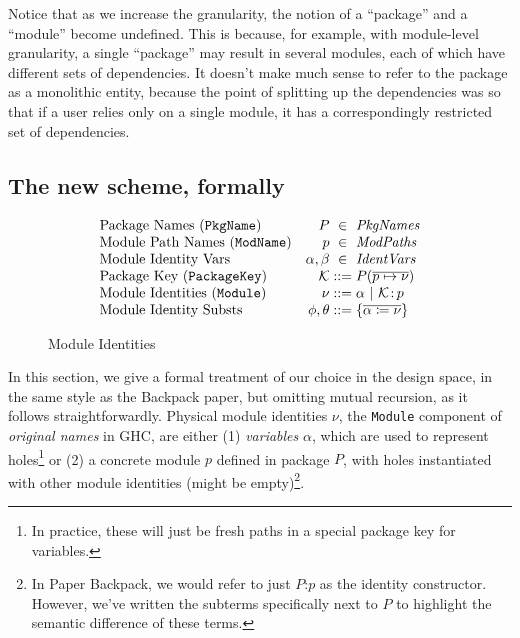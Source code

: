\documentclass{article}
\begin{document}
Notice that as we increase the granularity, the notion of a ``package'' and a ``module''
become undefined.  This is because, for example, with module-level granularity, a single
``package'' may result in several modules, each of which have different sets of
dependencies.  It doesn't make much sense to refer to the package as a monolithic entity,
because the point of splitting up the dependencies was so that if a user relies only
on a single module, it has a correspondingly restricted set of dependencies.
\subsection{The new scheme, formally}

\begin{figure}
\begin{myfig}
\[
\begin{array}{@{}lr@{\;}c@{\;}l@{}}
    \text{Package Names (\texttt{PkgName})} & P &\in& \mathit{PkgNames} \\
    \text{Module Path Names (\texttt{ModName})} & p &\in& \mathit{ModPaths} \\
    \text{Module Identity Vars} & \alpha,\beta &\in& \mathit{IdentVars} \\
    \text{Package Key (\texttt{PackageKey})} & \K &::=& P(\vec{p\mapsto\nu}) \\
    \text{Module Identities (\texttt{Module})} & \nu &::=&
      \alpha ~|~
      \K\colon\! p \\
    \text{Module Identity Substs} & \phi,\theta &::=&
      \{\vec{\alpha \coloneqq \nu}\} \\
\end{array}
\]
\caption{Module Identities}
\label{fig:mod-idents}
\end{myfig}
\end{figure}

In this section, we give a formal treatment of our choice in the design space, in the
same style as the Backpack paper, but omitting mutual recursion, as it follows straightforwardly.
Physical module
identities $\nu$, the \texttt{Module} component of \emph{original names} in GHC, are either (1) \emph{variables} $\alpha$, which are
used to represent holes\footnote{In practice, these will just be fresh paths in a special package key for variables.} or (2) a concrete module $p$ defined in package
$P$, with holes instantiated with other module identities (might be
empty)\footnote{In Paper Backpack, we would refer to just $P$:$p$ as the identity
constructor.  However, we've written the subterms specifically next to $P$ to highlight the semantic difference of these terms.}.
\end{document}
